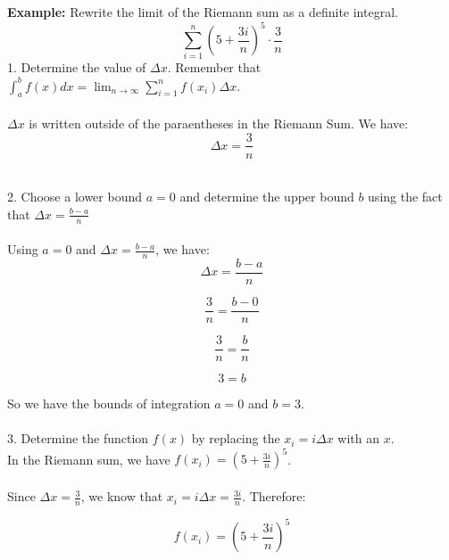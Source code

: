 \begin{framed}
  \noindent \textbf{Example:}
  Rewrite the limit of the Riemann sum as a definite integral. 
  \begin{equation*}
    \sum_{i=1}^{n} \left(5 + \frac{3i}{n}\right)^5 \cdot \frac{3}{n}
  \end{equation*}
  1. Determine the value of $\Delta x$. Remember that $ \int_a^b f(x)dx = 
        \lim_{n \to \infty} \sum_{i=1}^{n} f(x_i) \Delta x.$\\\\
  $\Delta x$ is written outside of the paraentheses in the Riemann Sum. We have:
  \begin{equation*}
    \Delta x = \frac{3}{n}
  \end{equation*}

  \noindent \\2. Choose a lower bound $a=0$ and determine the upper bound $b$ 
  using the fact that $\Delta x = \frac{b-a}{n}$\\\\

  Using $a = 0$ and $\Delta x = \frac{b - a}{n}$, we have:
  \begin{equation*}
    \Delta x = \frac{b - a}{n}
  \end{equation*}

  \begin{equation*}
    \frac{3}{n} = \frac{b - 0}{n}
  \end{equation*}

  \begin{equation*}
    \frac{3}{n} = \frac{b}{n}
  \end{equation*}

  \begin{equation*}
    3 = b
  \end{equation*}

  \noindent So we have the bounds of integration $a = 0$ and $b = 3$.\\\\
  3. Determine the function $f(x)$ by replacing the $x_i = i \Delta x$ with 
  an $x$.\\

  \noindent In the Riemann sum, we have $f(x_i)=\left(5+\frac{3i}{n}\right)^5$.\\\\
  \noindent Since $\Delta x = \frac{3}{n}$, we know that $x_i=i\Delta x 
  = \frac{3i}{n}$. Therefore:

  \begin{equation*}
    f(x_i) = \left(5+\frac{3i}{n}\right)^5
  \end{equation*}


\end{framed}
